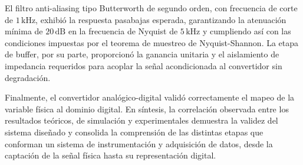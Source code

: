 \documentclass[journal, onecolumn]{IEEEtran}
\begin{document}
El filtro anti-aliasing tipo Butterworth de segundo orden, con frecuencia de corte de $1\,\text{kHz}$, exhibió la respuesta pasabajas esperada, garantizando la atenuación mínima de $20\,\text{dB}$ en la frecuencia de Nyquist de $5\,\text{kHz}$ y cumpliendo así con las condiciones impuestas por el teorema de muestreo de Nyquist-Shannon. La etapa de buffer, por su parte, proporcionó la ganancia unitaria y el aislamiento de impedancia requeridos para acoplar la señal acondicionada al convertidor sin degradación.

Finalmente, el convertidor analógico-digital validó correctamente el mapeo de la variable física al dominio digital.
En síntesis, la correlación observada entre los resultados teóricos, de simulación y experimentales demuestra la validez del sistema diseñado y consolida la comprensión de las distintas etapas que conforman un sistema de instrumentación y adquisición de datos, desde la captación de la señal física hasta su representación digital.








\printbibliography

\vfill
\end{document}

